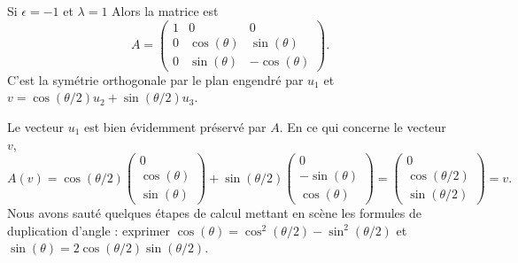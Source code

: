 \begin{subproof}
    \item[Si \( \epsilon=-1\) et \( \lambda=1\)] Alors la matrice est
        \begin{equation}
            A=\begin{pmatrix}
                1    &   0    &   0    \\
                0    &   \cos(\theta)    &   \sin(\theta)    \\
                0    &   \sin(\theta)    &   -\cos(\theta)
            \end{pmatrix}.
        \end{equation}
        C'est la symétrie orthogonale par le plan engendré par \( u_1\) et \( v=\cos(\theta/2)u_2+\sin(\theta/2)u_3\).

        Le vecteur \( u_1\) est bien évidemment préservé par \( A\). En ce qui concerne le vecteur \( v\),
        \begin{equation}
            A(v)=\cos(\theta/2)\begin{pmatrix}
                0    \\
                \cos(\theta)    \\
                \sin(\theta)
            \end{pmatrix}+\sin(\theta/2)\begin{pmatrix}
                0    \\
                -\sin(\theta)    \\
                \cos(\theta)
            \end{pmatrix}=
            \begin{pmatrix}
                0    \\
                \cos(\theta/2)    \\
                \sin(\theta/2)
            \end{pmatrix}=v.
        \end{equation}
        Nous avons sauté quelques étapes de calcul mettant en scène les formules de duplication d'angle : exprimer \( \cos(\theta)=\cos^2(\theta/2)-\sin^2(\theta/2)\) et \( \sin(\theta)=2\cos(\theta/2)\sin(\theta/2)\).


\end{subproof}

